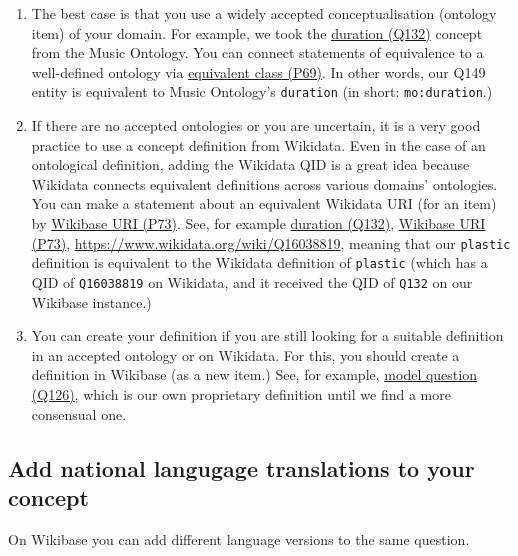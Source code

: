 \documentclass[
  letterpaper,
  DIV=11,
  numbers=noendperiod]{scrreprt}
\begin{document}
\begin{enumerate}
\def\labelenumi{\arabic{enumi}.}
\item
  The best case is that you use a widely accepted conceptualisation
  (ontology item) of your domain. For example, we took the
  \href{https://reprexbase.eu/demowiki/index.php?title=Item:Q132}{duration
  (Q132)} concept from the Music Ontology. You can connect statements of
  equivalence to a well-defined ontology via
  \href{https://reprexbase.eu/demowiki/index.php?title=Property:P69}{equivalent
  class (P69)}. In other words, our Q149 entity is equivalent to Music
  Ontology's \texttt{duration} (in short: \texttt{mo:duration}.)
\item
  If there are no accepted ontologies or you are uncertain, it is a very
  good practice to use a concept definition from Wikidata. Even in the
  case of an ontological definition, adding the Wikidata QID is a great
  idea because Wikidata connects equivalent definitions across various
  domains' ontologies. You can make a statement about an equivalent
  Wikidata URI (for an item) by
  \href{https://reprexbase.eu/demowiki/index.php?title=Property:P73}{Wikibase
  URI (P73)}. See, for example
  \href{https://reprexbase.eu/demowiki/index.php?title=Item:Q132}{duration
  (Q132)},
  \href{https://reprexbase.eu/demowiki/index.php?title=Property:P73}{Wikibase
  URI (P73)},
  \href{https://www.wikidahttps://www.wikidata.org/wiki/Q16038819}{https://www.wikidata.org/wiki/Q16038819},
  meaning that our \texttt{plastic} definition is equivalent to the
  Wikidata definition of \texttt{plastic} (which has a QID of
  \texttt{Q16038819} on Wikidata, and it received the QID of
  \texttt{Q132} on our Wikibase instance.)
\item
  You can create your definition if you are still looking for a suitable
  definition in an accepted ontology or on Wikidata. For this, you
  should create a definition in Wikibase (as a new item.) See, for
  example,
  \href{https://reprexbase.eu/demowiki/index.php?title=Item:Q126}{model
  question (Q126)}, which is our own proprietary definition until we
  find a more consensual one.
\end{enumerate}

\subsection{Add national langugage translations to your
concept}\label{add-national-langugage-translations-to-your-concept}

On Wikibase you can add different language versions to the same
question.
\end{document}
